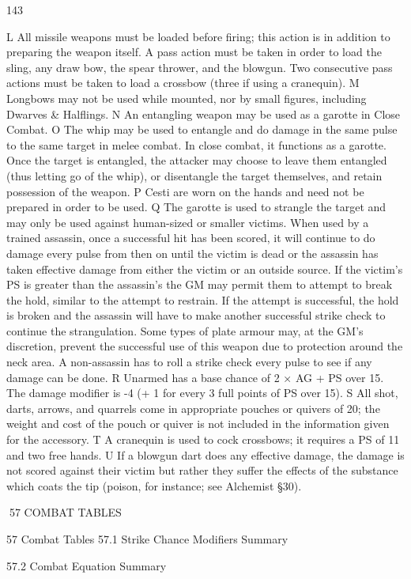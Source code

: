 \documentclass[a4paper]{article}
\begin{document}
\begin{multicols}{3}
143

L All missile weapons must be loaded before firing; this action is in addition to preparing the
weapon itself. A pass action must be taken in order
to load the sling, any draw bow, the spear thrower,
and the blowgun. Two consecutive pass actions
must be taken to load a crossbow (three if using a
cranequin).
M Longbows may not be used while mounted, nor
by small figures, including Dwarves & Halflings.
N An entangling weapon may be used as a garotte
in Close Combat.
O The whip may be used to entangle and do damage in the same pulse to the same target in melee
combat. In close combat, it functions as a garotte.
Once the target is entangled, the attacker may
choose to leave them entangled (thus letting go of
the whip), or disentangle the target themselves, and
retain possession of the weapon.
P Cesti are worn on the hands and need not be
prepared in order to be used.
Q The garotte is used to strangle the target and
may only be used against human-sized or smaller
victims. When used by a trained assassin, once a
successful hit has been scored, it will continue to
do damage every pulse from then on until the
victim is dead or the assassin has taken effective
damage from either the victim or an outside source.
If the victim’s PS is greater than the assassin’s the
GM may permit them to attempt to break the hold,
similar to the attempt to restrain. If the attempt is
successful, the hold is broken and the assassin will
have to make another successful strike check to
continue the strangulation. Some types of plate
armour may, at the GM’s discretion, prevent the
successful use of this weapon due to protection
around the neck area. A non-assassin has to roll a
strike check every pulse to see if any damage can
be done.
R Unarmed has a base chance of 2 × AG + PS over
15. The damage modifier is -4 (+ 1 for every 3 full
points of PS over 15).
S All shot, darts, arrows, and quarrels come in
appropriate pouches or quivers of 20; the weight
and cost of the pouch or quiver is not included in
the information given for the accessory.
T A cranequin is used to cock crossbows; it requires a PS of 11 and two free hands.
U If a blowgun dart does any effective damage, the
damage is not scored against their victim but rather
they suffer the effects of the substance which coats
the tip (poison, for instance; see Alchemist §30).

57 COMBAT TABLES

57 Combat Tables
57.1 Strike Chance Modifiers Summary

57.2 Combat Equation Summary


\end{multicols}
\end{document}
